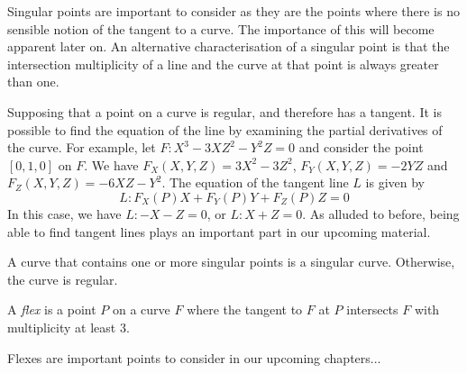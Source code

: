 Singular points are important to consider as they are the points where there is no sensible notion of the tangent to a curve.
The importance of this will become apparent later on.
An alternative characterisation of a singular point is that the intersection multiplicity of a line and the curve at that point is always greater than one.

Supposing that a point on a curve is regular, and therefore has a tangent.
It is possible to find the equation of the line by examining the partial derivatives of the curve.
For example, let $F: X^3 - 3XZ^2 - Y^2Z = 0$ and consider the point $[0,1,0]$ on $F$.
We have $F_X(X,Y,Z) = 3X^2 -3Z^2$, $F_Y(X,Y,Z) = -2YZ$ and $F_Z(X,Y,Z) = -6XZ - Y^2$.
The equation of the tangent line $L$ is given by
$$L : F_X(P)X + F_Y(P)Y + F_Z(P)Z = 0$$
In this case, we have $L : -X - Z = 0$, or $L: X + Z = 0$.
As alluded to before, being able to find tangent lines plays an important part in our upcoming material.

\begin{definition}
	A curve that contains one or more singular points is a singular curve. Otherwise, the curve is regular.
\end{definition}

\begin{definition}
	A \emph{flex} is a point $P$ on a curve $F$ where the tangent to $F$ at $P$ intersects $F$ with multiplicity at least 3.
\end{definition}

Flexes are important points to consider in our upcoming chapters...
